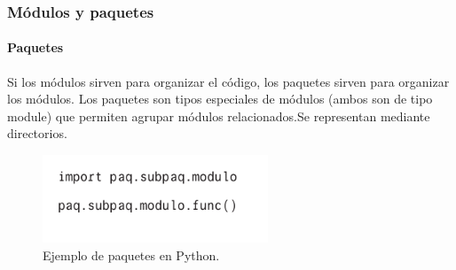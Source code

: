 \begin{frame}[fragile]
  \frametitle{M\'odulos y paquetes}

  \framesubtitle{Paquetes}

  Si los m\'odulos sirven para organizar el c\'odigo, los paquetes sirven para organizar los m\'odulos. Los paquetes son tipos especiales de m\'odulos (ambos son de tipo module) que permiten agrupar m\'odulos relacionados.Se representan mediante directorios.

  \begin{figure}
    \includegraphics[width=0.6\textwidth]{Imagenes/Paquetes.jpg}
    \caption{\label{fig:Ejemplo12}Ejemplo de paquetes en Python.}
  \end{figure}

 

\end{frame}

